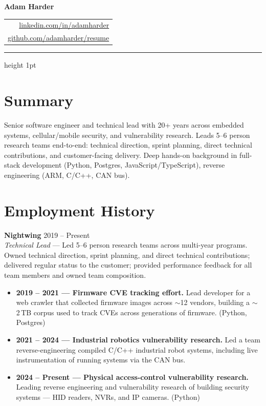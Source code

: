 \documentclass[11pt,letterpaper]{article}
\begin{document}
\noindent
\begin{minipage}[t]{\textwidth}
{\Huge\bfseries\color{accent} Adam Harder}\hfill
\begin{tabular}[b]{r@{}}
\small\color{accentlight}\href{http://www.linkedin.com/in/adamharder}{linkedin.com/in/adamharder}\\
\small\color{accentlight}\href{https://github.com/adamharder/resume/blob/master/resume.pdf}{github.com/adamharder/resume}
\end{tabular}
\end{minipage}
\par\vspace{4pt}
{\color{accent}\hrule height 1pt}
\vspace{2pt}

\section*{Summary}
Senior software engineer and technical lead with 20+ years across embedded
systems, cellular/mobile security, and vulnerability research. Leads 5--6
person research teams end-to-end: technical direction, sprint planning, direct
technical contributions, and customer-facing delivery. Deep hands-on
background in full-stack development (Python, Postgres,
JavaScript/TypeScript), reverse engineering (ARM, C/C++, CAN bus).

\section*{Employment History}

\noindent\textbf{\color{accent}Nightwing} \hfill {\small\color{accentlight}2019 -- Present}\\
\textit{Technical Lead} --- Led 5--6 person research teams across multi-year
programs. Owned technical direction, sprint planning, and direct technical
contributions; delivered regular status to the customer; provided performance
feedback for all team members and owned team composition.
\begin{itemize}
  \item \textbf{2019 -- 2021 --- Firmware CVE tracking effort.} Lead developer for a
        web crawler that collected firmware images across $\sim$12 vendors,
        building a $\sim$2\,TB corpus used to track CVEs across generations of
        firmware. (Python, Postgres)
  \item \textbf{2021 -- 2024 --- Industrial robotics vulnerability research.}
        Led a team reverse-engineering compiled C/C++ industrial robot
        systems, including live instrumentation of running systems via the
        CAN bus.
  \item \textbf{2024 -- Present --- Physical access-control vulnerability
        research.} Leading reverse engineering and vulnerability research of
        building security systems --- HID readers, NVRs, and IP cameras.
        (Python)
\end{itemize}
\end{document}

